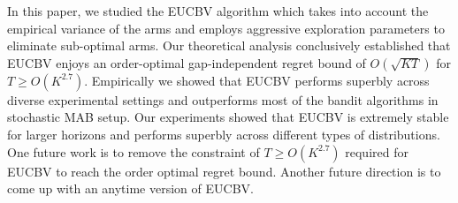 In this paper, we studied the EUCBV algorithm which takes into account the empirical variance of the arms and employs aggressive exploration parameters to eliminate sub-optimal arms. Our theoretical analysis conclusively established that EUCBV enjoys an order-optimal gap-independent regret bound of $O\left(\sqrt{KT}\right)$ for $T\geq O\left( K^{2.7}\right)$. Empirically we showed that EUCBV performs superbly across diverse experimental settings and outperforms most of the bandit algorithms in stochastic  MAB setup. Our experiments showed that EUCBV is extremely stable for larger horizons and performs superbly  across different types of distributions. One future work is to remove the constraint of $T\geq O\left( K^{2.7}\right)$ required for EUCBV to reach the order optimal regret bound. Another future direction is to come up with an anytime version of EUCBV. 
